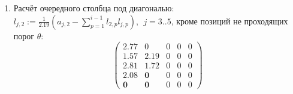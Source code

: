 \begin{multicols}{3}
\begin{enumerate}
    \item Расчёт очередного столбца под диагональю:$l_{j,2} := \frac{1}{2.19}(a_{j,2} - \sum_{p=1}^{i-1}l_{2,p}l_{j,p}),~~j=3..5$, кроме позиций не проходящих порог $\theta$:
    $$\begin{pmatrix}
        2.77       & 0          & 0 & 0 & 0 \\
        1.57       & 2.19       & 0 & 0 & 0 \\
        2.81       & 1.72       & 0 & 0 & 0 \\
        2.08       & \mathbf{0} & 0 & 0 & 0 \\
        \mathbf{0} & \mathbf{0} & 0 & 0 & 0
    \end{pmatrix}$$
\end{enumerate}
\end{multicols}

\clearpage

